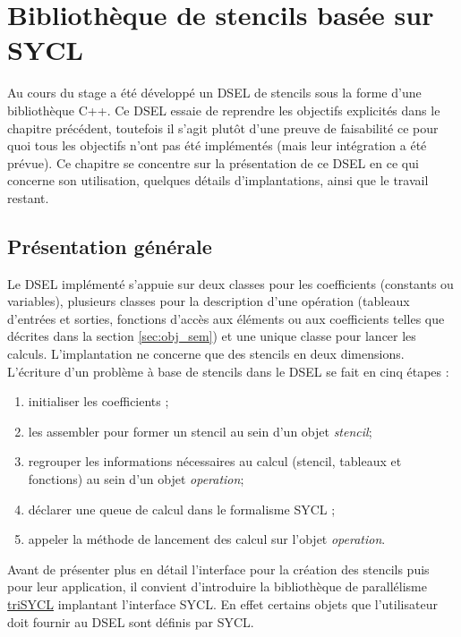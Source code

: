 
\chapter{Bibliothèque de stencils basée sur \textsf{SYCL}}

Au cours du stage a été développé un DSEL de stencils sous la forme d'une bibliothèque \textsf{C++}. Ce DSEL essaie de reprendre les objectifs explicités dans le chapitre précédent, toutefois il s'agit plutôt d'une preuve de faisabilité ce pour quoi tous les objectifs n'ont pas été implémentés (mais leur intégration a été prévue). Ce chapitre se concentre sur la présentation de ce DSEL en ce qui concerne son utilisation, quelques détails d'implantations, ainsi que le travail restant.

\section{Présentation générale}

Le DSEL implémenté s'appuie sur deux classes pour les coefficients (constants ou variables), plusieurs classes pour la description d'une opération (tableaux d'entrées et sorties, fonctions d'accès aux éléments ou aux coefficients telles que décrites dans la section \ref{sec:obj_sem}) et une unique classe pour lancer les calculs. L'implantation ne concerne que des stencils en deux dimensions. L'écriture d'un problème à base de stencils dans le DSEL se fait en cinq étapes :

\begin{enumerate}
\item initialiser les coefficients ;
\item les assembler pour former un stencil au sein d'un objet \emph{stencil};
\item regrouper les informations nécessaires au calcul (stencil, tableaux et fonctions) au sein d'un objet \emph{operation};
\item déclarer une queue de calcul dans le formalisme \textsf{SYCL} ;
\item appeler la méthode de lancement des calcul sur l'objet \emph{operation}.
\end{enumerate}

Avant de présenter plus en détail l'interface pour la création des stencils puis pour leur application, il convient d'introduire la bibliothèque de parallélisme \textsf{\href{https://github.com/amd/triSYCL}{triSYCL}} implantant l'interface \textsf{SYCL}. En effet certains objets que l'utilisateur doit fournir au DSEL sont définis par \textsf{SYCL}.

